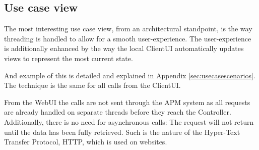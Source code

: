 \subsection{Use case view}

The most interesting use case view, from an architectural standpoint, is the way threading is handled
to allow for a smooth user-experience. The user-experience is additionally enhanced by the way the
local ClientUI automatically updates views to represent the most current state.

And example of this is detailed and explained in Appendix \ref{sec:usecasescenarios}. The technique
is the same for all calls from the ClientUI.

From the WebUI the calls are not sent through the APM system as all requests are already handled on
separate threads before they reach the Controller. Additionally, there is no need for asynchronous calls:
The request will not return until the data has been fully retrieved. Such is the nature of the Hyper-Text
Transfer Protocol, HTTP, which is used on websites.